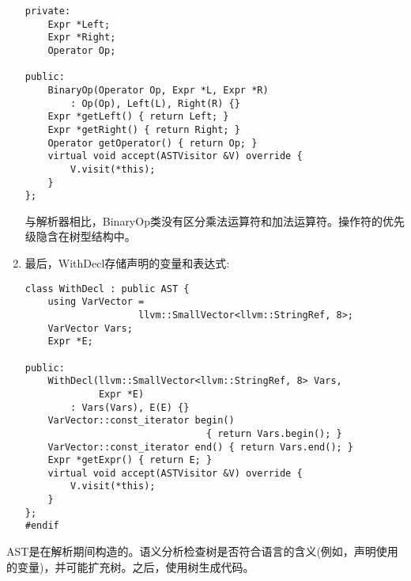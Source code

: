 \begin{enumerate}
\begin{lstlisting}[caption={}]
private:
	Expr *Left;
	Expr *Right;
	Operator Op;
	
public:
	BinaryOp(Operator Op, Expr *L, Expr *R)
		: Op(Op), Left(L), Right(R) {}
	Expr *getLeft() { return Left; }
	Expr *getRight() { return Right; }
	Operator getOperator() { return Op; }
	virtual void accept(ASTVisitor &V) override {
		V.visit(*this);
	}
};	
\end{lstlisting}
与解析器相比，BinaryOp类没有区分乘法运算符和加法运算符。操作符的优先级隐含在树型结构中。

\item 最后，WithDecl存储声明的变量和表达式:
\begin{lstlisting}[caption={}]
class WithDecl : public AST {
	using VarVector =
					llvm::SmallVector<llvm::StringRef, 8>;
	VarVector Vars;
	Expr *E;
	
public:
	WithDecl(llvm::SmallVector<llvm::StringRef, 8> Vars,
			 Expr *E)
		: Vars(Vars), E(E) {}
	VarVector::const_iterator begin()
								{ return Vars.begin(); }
	VarVector::const_iterator end() { return Vars.end(); }
	Expr *getExpr() { return E; }
	virtual void accept(ASTVisitor &V) override {
		V.visit(*this);
	}
};
#endif	
\end{lstlisting}

\end{enumerate}

AST是在解析期间构造的。语义分析检查树是否符合语言的含义(例如，声明使用的变量)，并可能扩充树。之后，使用树生成代码。




































